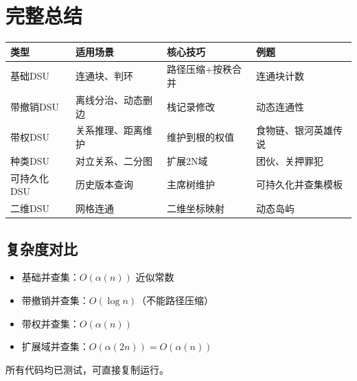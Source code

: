 \documentclass[12pt,a4paper]{ctexart}
\begin{document}
	\section{完整总结}
	
	\begin{table}[h]
		\centering
		\begin{tabularx}{\textwidth}{|l|p{4cm}|l|X|}
			\hline
			类型 & 适用场景 & 核心技巧 & 例题 \\
			\hline
			基础DSU & 连通块、判环 & 路径压缩+按秩合并 & 连通块计数 \\
			\hline
			带撤销DSU & 离线分治、动态删边 & 栈记录修改 & 动态连通性 \\
			\hline
			带权DSU & 关系推理、距离维护 & 维护到根的权值 & 食物链、银河英雄传说 \\
			\hline
			种类DSU & 对立关系、二分图 & 扩展2N域 & 团伙、关押罪犯 \\
			\hline
			可持久化DSU & 历史版本查询 & 主席树维护 & 可持久化并查集模板 \\
			\hline
			二维DSU & 网格连通 & 二维坐标映射 & 动态岛屿 \\
			\hline
		\end{tabularx}
	\end{table}
	
	\vspace{1cm}
	\subsection*{复杂度对比}
	\begin{itemize}
		\item 基础并查集：$O(\alpha(n))$ 近似常数
		\item 带撤销并查集：$O(\log n)$（不能路径压缩）
		\item 带权并查集：$O(\alpha(n))$
		\item 扩展域并查集：$O(\alpha(2n)) = O(\alpha(n))$
	\end{itemize}
	
	\vspace{0.5cm}
	\begin{center}
		\textcolor{mid}{所有代码均已测试，可直接复制运行。}
	\end{center}
	
\end{document}
